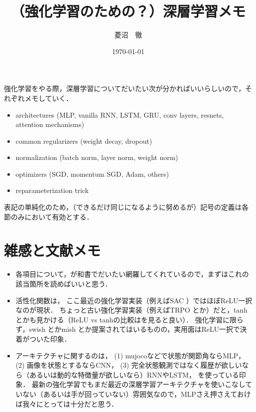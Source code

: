 \documentclass{jsarticle}
\title{（強化学習のための？）深層学習メモ}
\author{菱沼　徹}
\date{\today}
\begin{document}
\maketitle


強化学習をやる際，深層学習についてだいたい次が分かればいいらしい\cite{SpinningUp2018}ので，それぞれメモしていく．
\begin{itemize}
\item architectures (MLP, vanilla RNN, LSTM, GRU, conv layers, resnets, attention mechanisms)
\item common regularizers (weight decay, dropout)
\item normalization (batch norm, layer norm, weight norm)
\item optimizers (SGD, momentum SGD, Adam, others)
\item reparameterization trick
\end{itemize}

表記の単純化のため，（できるだけ同じになるように努めるが）記号の定義は各節のみにおいて有効とする．


\clearpage


\clearpage


\clearpage


\clearpage


\clearpage


\section{雑感と文献メモ}
\begin{itemize}
\item 各項目について，\cite{suyama2019bayesian}が和書でだいたい網羅してくれているので，まずはこれの該当箇所を読めばいいと思う．
\item
活性化関数は，
ここ最近の強化学習実装（例えばSAC \cite{haarnoja2018soft}）ではほぼReLU一択なのが現状．
ちょっと古い強化学習実装（例えばTRPO \cite{schulman2015trust}とか）だと，tanhとかも見かける（ReLU vs tanhの比較は\cite{henderson2018deep}を見ると良い）．
強化学習に限らず，swish \cite{ramachandran2018searching}とかmish \cite{misra2019mish}とか提案されてはいるものの，実用面はReLU一択で決着がついた印象．
\item
アーキテクチャに関するのは，
(1) mujocoなどで状態が関節角ならMLP，
(2) 画像を状態とするならCNN，
(3) 完全状態観測ではなく履歴が欲しいなら（あるいは動的な特徴量が欲しいなら）RNNやLSTM，
を使っている印象．
最新の強化学習でもまだ最近の深層学習アーキテクチャを使いこなしていない（あるいは手が回っていない）雰囲気なので，MLPさえ押さえておけば我々にとっては十分だと思う．
\end{itemize}


\end{document}
